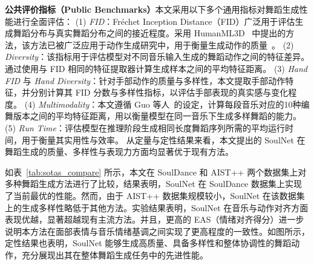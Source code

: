 \noindent\textbf{公共评价指标（Public Benchmarks）}\quad 本文采用以下多个通用指标对舞蹈生成性能进行全面评估：
(1) \textit{FID}：Fréchet Inception Distance（FID）广泛用于评估生成舞蹈分布与真实舞蹈分布之间的接近程度。采用 HumanML3D~\cite{guo2022generating} 中提出的方法，该方法已被广泛应用于动作生成研究中，用于衡量生成动作的质量~\cite{guo2024momask, lu2023humantomato, guo2022tm2t, li2023finedance}。
(2) \textit{Diversity}：该指标用于评估模型对不同音乐输入生成的舞蹈动作之间的特征差异。通过使用与 FID 相同的特征提取器计算生成样本之间的平均特征距离。
(3) \textit{Hand FID} 与 \textit{Hand Diversity}：针对手部动作的质量与多样性，本文提取手部动作特征，并分别计算其 FID 分数与多样性指标，以评估手部表现的真实感与变化程度。
(4) \textit{Multimodality}：本文遵循 Guo 等人~\cite{guo2022generating}的设定，计算每段音乐对应的10种编舞版本之间的平均特征距离，用以衡量模型在同一音乐下生成多样舞蹈的能力。
(5) \textit{Run Time}：评估模型在推理阶段生成相同长度舞蹈序列所需的平均运行时间，用于衡量其实用性与效率。
从定量与定性结果来看，本文提出的 SoulNet 在舞蹈生成的质量、多样性与表现力方面均显著优于现有方法。

% 


如表~\ref{tab:sotas_compare} 所示，本文在 SoulDance 和 AIST++ 两个数据集上对多种舞蹈生成方法进行了比较，结果表明，SoulNet 在 SoulDance 数据集上实现了当前最优的性能。然而，由于 AIST++ 数据集规模较小，SoulNet 在该数据集上的生成多样性略低于其他方法。实验结果表明，SoulNet 在音乐与动作对齐方面表现优越，显著超越现有主流方法。并且，更高的 EAS（情绪对齐得分）进一步说明本方法在面部表情与音乐情绪基调之间实现了更高程度的一致性。如图所示，定性结果也表明，SoulNet 能够生成高质量、具备多样性和整体协调性的舞蹈动作，充分展现出其在整体舞蹈生成任务中的先进性能。



